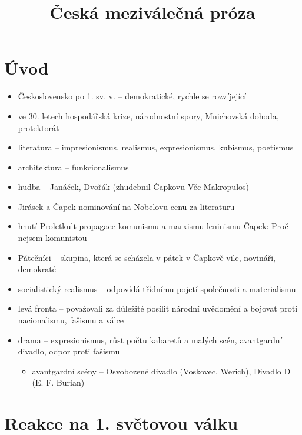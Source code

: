 \title{Česká meziválečná próza}


\section{Úvod}
\begin{itemize}
\item Československo po 1. sv. v. -- demokratické, rychle se rozvíjející
\item ve 30. letech hospodářská krize, národnostní spory, Mnichovská dohoda, protektorát
\item literatura -- impresionismus, realismus, expresionismus, kubismus, poetismus
\item architektura -- funkcionalismus
\item hudba -- Janáček, Dvořák (zhudebnil Čapkovu Věc Makropulos)
\item Jirásek a Čapek nominování na Nobelovu cenu za literaturu
\item hnutí Proletkult propagace komunismu a marxismu-leninismu \ra Čapek: Proč nejsem komunistou
\item Pátečníci -- skupina, která se scházela v pátek v Čapkově vile, novináři, demokraté
\item socialistický realismus -- odpovídá třídnímu pojetí společnosti a materialismu
\item levá fronta -- považovali za důležité posílit národní uvědomění a bojovat proti nacionalismu, fašismu a válce
\item drama -- expresionismus, růst počtu kabaretů a malých scén, avantgardní divadlo, odpor proti fašismu
	\begin{itemize}
	\item avantgardní scény -- Osvobozené divadlo (Voskovec, Werich), Divadlo D (E. F. Burian)
	\end{itemize}
\end{itemize}

\section{Reakce na 1. světovou válku}
